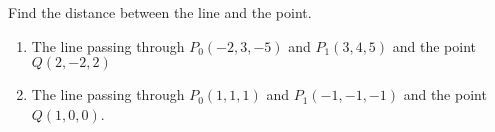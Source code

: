 Find the distance between the line and the point.

\begin{enumerate}
\item The line passing through $P_0(-2,3,-5)$ and $P_1(3,4,5)$ and the point $Q(2,-2,2)$
\item The line passing through $P_0(1,1,1)$ and $P_1(-1,-1,-1)$ and the point $Q(1,0,0)$.
\end{enumerate}